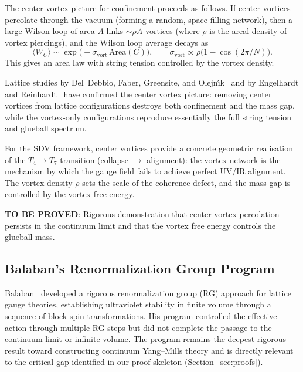 \documentclass[11pt]{article}
\begin{document}
The center vortex picture for confinement proceeds as follows.  If center
vortices percolate through the vacuum (forming a random, space-filling
network), then a large Wilson loop of area $A$ links $\sim \rho A$
vortices (where $\rho$ is the areal density of vortex piercings), and
the Wilson loop average decays as
\begin{equation}\label{eq:vortex-area-law}
  \langle W_C \rangle \sim \exp\bigl(-\sigma_{\mathrm{vort}}\,
  \mathrm{Area}(C)\bigr),
  \qquad \sigma_{\mathrm{vort}} \propto \rho\bigl(1 - \cos(2\pi/N)\bigr).
\end{equation}
This gives an area law with string tension controlled by the vortex density.

Lattice studies by Del~Debbio, Faber, Greensite, and
Olejn\'\i k~\cite{DFGO} and by Engelhardt and Reinhardt~\cite{EngRein}
have confirmed the center vortex picture: removing center vortices from
lattice configurations destroys both confinement and the mass gap, while
the vortex-only configurations reproduce essentially the full string
tension and glueball spectrum.

For the SDV framework, center vortices provide a concrete geometric
realisation of the $T_4 \to T_7$ transition (collapse $\to$ alignment):
the vortex network is the mechanism by which the gauge field fails to
achieve perfect UV/IR alignment.  The vortex density $\rho$ sets the scale
of the coherence defect, and the mass gap is controlled by the vortex
free energy.

\textbf{TO BE PROVED}: Rigorous demonstration that center vortex
percolation persists in the continuum limit and that the vortex free energy
controls the glueball mass.

\subsection{Balaban's Renormalization Group Program}

Balaban~\cite{Balaban} developed a rigorous renormalization group (RG)
approach for lattice gauge theories, establishing ultraviolet stability
in finite volume through a sequence of block-spin transformations.
His program controlled the effective action through multiple RG steps
but did not complete the passage to the continuum limit or infinite
volume.  The program remains the deepest rigorous result toward
constructing continuum Yang--Mills theory and is directly relevant
to the critical gap identified in our proof skeleton (Section~\ref{sec:proofs}).
\end{document}
